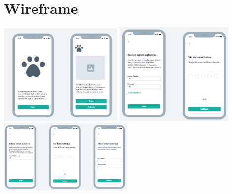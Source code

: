 \chapter{Wireframe}
\begin{center}
\includegraphics[width=230]{exemplos/Wireframe/Wireframe1.PNG}
\includegraphics[width=220]{exemplos/Wireframe/Wireframe2.PNG}
\\
\includegraphics[width=250]{exemplos/Wireframe/Wireframe3.PNG}

\end{center}
